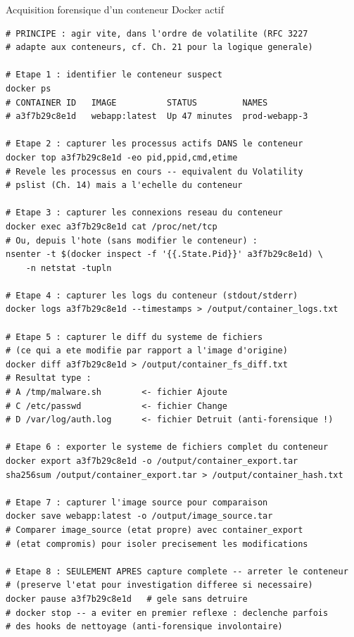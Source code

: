 \begin{boxoutils}{Acquisition forensique d'un conteneur Docker actif}
\begin{lstlisting}[language=bash_forensique]
# PRINCIPE : agir vite, dans l'ordre de volatilite (RFC 3227
# adapte aux conteneurs, cf. Ch. 21 pour la logique generale)

# Etape 1 : identifier le conteneur suspect
docker ps
# CONTAINER ID   IMAGE          STATUS         NAMES
# a3f7b29c8e1d   webapp:latest  Up 47 minutes  prod-webapp-3

# Etape 2 : capturer les processus actifs DANS le conteneur
docker top a3f7b29c8e1d -eo pid,ppid,cmd,etime
# Revele les processus en cours -- equivalent du Volatility
# pslist (Ch. 14) mais a l'echelle du conteneur

# Etape 3 : capturer les connexions reseau du conteneur
docker exec a3f7b29c8e1d cat /proc/net/tcp
# Ou, depuis l'hote (sans modifier le conteneur) :
nsenter -t $(docker inspect -f '{{.State.Pid}}' a3f7b29c8e1d) \
    -n netstat -tupln

# Etape 4 : capturer les logs du conteneur (stdout/stderr)
docker logs a3f7b29c8e1d --timestamps > /output/container_logs.txt

# Etape 5 : capturer le diff du systeme de fichiers
# (ce qui a ete modifie par rapport a l'image d'origine)
docker diff a3f7b29c8e1d > /output/container_fs_diff.txt
# Resultat type :
# A /tmp/malware.sh        <- fichier Ajoute
# C /etc/passwd            <- fichier Change
# D /var/log/auth.log      <- fichier Detruit (anti-forensique !)

# Etape 6 : exporter le systeme de fichiers complet du conteneur
docker export a3f7b29c8e1d -o /output/container_export.tar
sha256sum /output/container_export.tar > /output/container_hash.txt

# Etape 7 : capturer l'image source pour comparaison
docker save webapp:latest -o /output/image_source.tar
# Comparer image_source (etat propre) avec container_export
# (etat compromis) pour isoler precisement les modifications

# Etape 8 : SEULEMENT APRES capture complete -- arreter le conteneur
# (preserve l'etat pour investigation differee si necessaire)
docker pause a3f7b29c8e1d   # gele sans detruire
# docker stop -- a eviter en premier reflexe : declenche parfois
# des hooks de nettoyage (anti-forensique involontaire)
\end{lstlisting}
\end{boxoutils}

